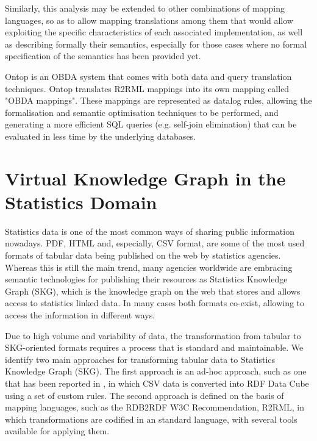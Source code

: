 Similarly, this analysis may be extended to other combinations of mapping languages, so as to allow mapping translations among them that would allow exploiting the specific characteristics of each associated implementation, as well as describing formally their semantics, especially for those cases where no formal specification of the semantics has been provided yet.

Ontop \citep{rodriguez2015efficient} is an OBDA system that comes with both data and query translation techniques. Ontop translates R2RML mappings into its own mapping called "OBDA mappings". These mappings are represented as datalog rules, allowing the formalisation and semantic optimisation techniques to be performed, and generating a more efficient SQL queries (e.g. self-join elimination) that can be evaluated in less time by the underlying databases.



\section{Virtual Knowledge Graph in the Statistics Domain}

Statistics data is one of the most common ways of sharing public information nowadays. PDF, HTML and, especially, CSV format, are some of the most used formats of tabular data being published on the web by statistics agencies. Whereas this is still the main trend, many agencies worldwide are embracing semantic technologies for publishing their resources as Statistics Knowledge Graph (SKG), which is the knowledge graph on the web that stores and allows access to statistics linked data. In many cases both formats co-exist, allowing to access the information in different ways. %

Due to high volume and variability of data, the transformation from tabular to SKG-oriented formats requires a process that is standard and maintainable. We identify two main approaches for transforming tabular data to Statistics Knowledge Graph (SKG). The first approach is an ad-hoc approach, such as one that has been reported in \citep{corcho2017publishing}, in which CSV data is converted into RDF Data Cube \citep{cyganiak2012rdf} using a set of custom rules. The second approach is defined on the basis of mapping languages, such as the RDB2RDF W3C Recommendation, R2RML, in which transformations are codified in an standard language, with several tools available for applying them.

